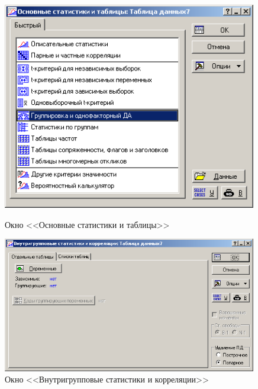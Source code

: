 \begin{figure}[!h]
  \centering
  \begin{minipage}{0.49\textwidth}
    \centering

    \includegraphics[width=0.99\textwidth]
    {inc/cars_my/3.1.PNG}

    \caption{Окно <<Основные статистики и таблицы>>}
    \label{fig:3_1}
  \end{minipage}
  \begin{minipage}{0.49\textwidth}
    \centering

    \includegraphics[width=0.99\textwidth]
    {inc/cars_my/3.2.PNG}

    \caption{Окно <<Внутригрупповые статистики и корреляции>>}
    \label{fig:3_2}
  \end{minipage}
\end{figure}

